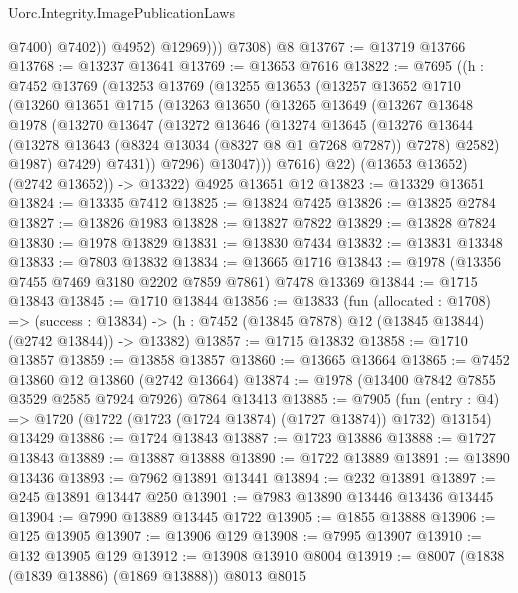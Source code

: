 \begin{lexlean}{Uorc.Integrity.ImagePublicationLaws}
\begin{coremodule}
                    @7400)
                  @7402))
              @4952)
            @12969)))
      @7308)
    @8
@13767 := @13719 @13766
@13768 := @13237 @13641
@13769 := @13653 @7616
@13822 := @7695
    ((h : @7452
      @13769
      (@13253
        @13769
        (@13255
          @13653
          (@13257
            @13652
            @1710
            (@13260
              @13651
              @1715
              (@13263
                @13650
                (@13265
                  @13649
                  (@13267
                    @13648
                    @1978
                    (@13270
                      @13647
                      (@13272
                        @13646
                        (@13274
                          @13645
                          (@13276
                            @13644
                            (@13278 @13643 (@8324 @13034 (@8327 @8 @1 @7268 @7287)) @7278)
                            @2582)
                          @1987)
                        @7429)
                      @7431))
                  @7296)
                @13047)))
          @7616)
        @22)
      (@13653 @13652)
      (@2742 @13652)) ->
    @13322)
    @4925
    @13651
    @12
@13823 := @13329 @13651
@13824 := @13335 @7412
@13825 := @13824 @7425
@13826 := @13825 @2784
@13827 := @13826 @1983
@13828 := @13827 @7822
@13829 := @13828 @7824
@13830 := @1978 @13829
@13831 := @13830 @7434
@13832 := @13831 @13348
@13833 := @7803 @13832
@13834 := @13665 @1716
@13843 := @1978 (@13356 @7455 @7469 @3180 @2202 @7859 @7861) @7478 @13369
@13844 := @1715 @13843
@13845 := @1710 @13844
@13856 := @13833
    (fun (allocated : @1708) =>
    (success : @13834) -> (h : @7452 (@13845 @7878) @12 (@13845 @13844) (@2742 @13844)) -> @13382)
@13857 := @1715 @13832
@13858 := @1710 @13857
@13859 := @13858 @13857
@13860 := @13665 @13664
@13865 := @7452 @13860 @12 @13860 (@2742 @13664)
@13874 := @1978 (@13400 @7842 @7855 @3529 @2585 @7924 @7926) @7864 @13413
@13885 := @7905
    (fun (entry : @4) => @1720 (@1722 (@1723 (@1724 @13874) (@1727 @13874)) @1732) @13154)
    @13429
@13886 := @1724 @13843
@13887 := @1723 @13886
@13888 := @1727 @13843
@13889 := @13887 @13888
@13890 := @1722 @13889
@13891 := @13890 @13436
@13893 := @7962 @13891 @13441
@13894 := @232 @13891
@13897 := @245 @13891 @13447 @250
@13901 := @7983 @13890 @13446 @13436 @13445
@13904 := @7990 @13889 @13445 @1722
@13905 := @1855 @13888
@13906 := @125 @13905
@13907 := @13906 @129
@13908 := @7995 @13907
@13910 := @132 @13905 @129
@13912 := @13908 @13910 @8004
@13919 := @8007 (@1838 (@1839 @13886) (@1869 @13888)) @8013 @8015

\end{coremodule}
\end{lexlean}
